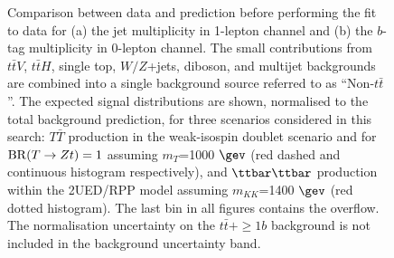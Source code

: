 \begin{figure}[h!]
\captionsetup{width=0.85\textwidth} \caption{\small Comparison between data and prediction before performing the fit to data for (a) the jet multiplicity in 1-lepton channel and (b) the $b$-tag multiplicity in 0-lepton channel. The small contributions from $t\bar{t}V$, $t\bar{t}H$, single top, $W/Z$+jets, diboson, and multijet backgrounds are combined into a single background source referred to as ``Non-$t\bar{t}$''. The expected signal distributions are shown, normalised to the total background prediction, for three scenarios considered in this search: $T\bar{T}$ production in the weak-isospin doublet scenario and for ${\rm BR}(T\to Zt) = 1$ assuming $m_{T}$=1000 $\gev$ (red dashed and continuous histogram respectively), and $\ttbar\ttbar$ production within the 2UED/RPP model assuming $m_{KK}$=1400 $\gev$ (red dotted histogram). The last bin in all figures contains the overflow. The normalisation uncertainty on the $t\bar{t}+\ge1b$ background is not included in the background uncertainty band.}
\label{sec:vlq:fig:njetsnbjetsyst}
\end{figure}




